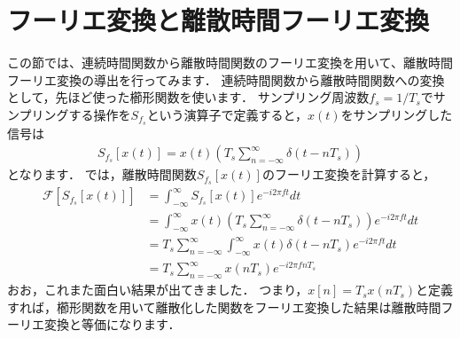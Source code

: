 \section{フーリエ変換と離散時間フーリエ変換}

この節では、連続時間関数から離散時間関数のフーリエ変換を用いて、離散時間フーリエ変換の導出を行ってみます．
連続時間関数から離散時間関数への変換として，先ほど使った櫛形関数を使います．
サンプリング周波数$f_s=1/T_s$でサンプリングする操作を$S_{f_s}$という演算子で定義すると，$x(t)$をサンプリングした信号は
\begin{align}
S_{f_s}[x(t)] = x(t) \left(T_s \sum_{n=-\infty}^{\infty} \delta\left(t- nT_s\right) \right)
\end{align}
となります．
では，離散時間関数$S_{f_s}[x(t)]$のフーリエ変換を計算すると，
\begin{align}
\mathcal{F}[S_{f_s}[x(t)]] &= \int_{-\infty}^{\infty} S_{f_s}[x(t)] e^{-i2\pi ft} dt\nonumber\\
    &= \int_{-\infty}^{\infty} x(t) \left(T_s \sum_{n=-\infty}^{\infty} \delta\left(t- nT_s\right) \right) e^{-i2\pi ft} dt \nonumber\\
    &= T_s \sum_{n=-\infty}^{\infty} \int_{-\infty}^{\infty} x(t) \delta\left(t- nT_s\right) e^{-i2\pi ft} dt \nonumber\\
    &= T_s \sum_{n=-\infty}^{\infty} x\left(nT_s\right) e^{-i2\pi fnT_s}
\end{align}
おお，これまた面白い結果が出てきました．
つまり，$x[n]=T_s x(nT_s)$と定義すれば，櫛形関数を用いて離散化した関数をフーリエ変換した結果は離散時間フーリエ変換と等価になります．

